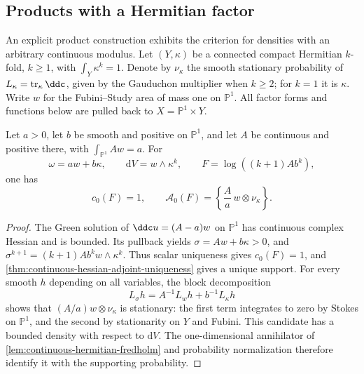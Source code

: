 \subsection{Products with a Hermitian factor}

An explicit product construction exhibits the criterion for densities
with an arbitrary continuous modulus. Let $(Y,\kappa)$ be a connected
compact Hermitian $k$-fold, $k\geq1$, with $\int_Y\kappa^k=1$.
Denote by $\nu_\kappa$ the smooth stationary probability of
$L_\kappa=\operatorname{tr}_\kappa\ddc$, given by the Gauduchon multiplier
when $k\geq2$; for $k=1$ it is $\kappa$. Write $w$ for the
Fubini--Study area of mass one on $\mathbb P^1$. All factor forms and
functions below are pulled back to $X=\mathbb P^1\times Y$.

\begin{proposition}\label{prop:continuous-product-adjoint}
Let $a>0$, let $b$ be smooth and positive on $\mathbb P^1$, and let $A$
be continuous and positive there, with $\int_{\mathbb P^1}Aw=a$.
For
\[
 \omega=aw+b\kappa,\qquad \mathrm dV=w\wedge\kappa^k,
 \qquad F=\log((k+1)Ab^k),
\]
one has
\[
 c_0(F)=1,\qquad
 \mathcal A_0(F)=\left\{\frac Aa\,w\otimes\nu_\kappa\right\}.
\]
\end{proposition}
\begin{proof}
The Green solution of $\ddc u=(A-a)w$ on $\mathbb P^1$ has continuous
complex Hessian and is bounded. Its pullback yields
$\sigma=Aw+b\kappa>0$, and
$\sigma^{k+1}=(k+1)Ab^kw\wedge\kappa^k$.
Thus scalar uniqueness gives $c_0(F)=1$, and
\cref{thm:continuous-hessian-adjoint-uniqueness} gives a unique support.
For every smooth $h$ depending on all variables, the block decomposition
\[
 L_\sigma h=A^{-1}L_wh+b^{-1}L_\kappa h
\]
shows that $(A/a)w\otimes\nu_\kappa$ is stationary: the first term
integrates to zero by Stokes on $\mathbb P^1$, and the second by
stationarity on $Y$ and Fubini. This candidate has a bounded density
with respect to $\mathrm dV$. The one-dimensional annihilator of
\cref{lem:continuous-hermitian-fredholm} and probability normalization
therefore identify it with the supporting probability.
\end{proof}

